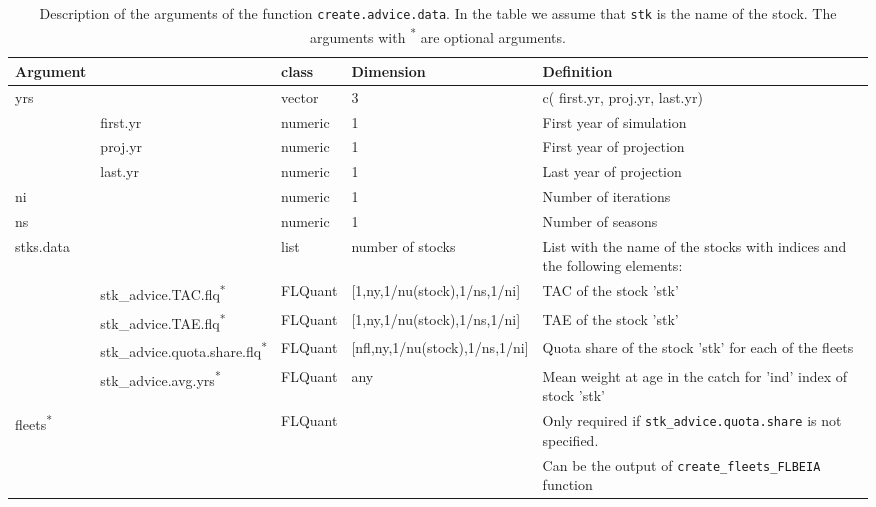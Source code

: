 \begin{landscape}
\begin{table}[!ht]
\end{table}

	

\begin{table}[!ht]

  \centering
  \begin{footnotesize}
    
    \caption{Description of the arguments of the function \texttt{create.advice.data}. 
      In the table we assume that \texttt{stk} is the name of the stock. 
      The arguments with \textsuperscript{*} are optional arguments.}
    
    \label{tb:A4.table6}
    
    \begin{threeparttable}
    
      \begin{tabular}{lllll} %
        \hline 
        Argument & & class & Dimension & Definition\\
        \hline
        yrs & & vector & 3 &	c( first.yr, proj.yr, last.yr)\\
          & first.yr & numeric & 1 & First year of simulation\\
          & proj.yr  & numeric & 1 & First year of projection\\
          & last.yr  & numeric & 1 & Last year of projection\\
        ni & & numeric &	1 &	Number of iterations\\
        ns & & numeric &	1 &	Number of seasons\\
        stks.data & &	list & number of stocks &	List with the name of the stocks with indices and the following elements:\\

          & stk\_advice.TAC.flq\textsuperscript{*} &	FLQuant &	[1,ny,1/nu(stock),1/ns,1/ni] &	TAC of the stock 'stk'\\
          & stk\_advice.TAE.flq\textsuperscript{*} &	FLQuant &	[1,ny,1/nu(stock),1/ns,1/ni] &	TAE of the stock 'stk'\\
          & stk\_advice.quota.share.flq\textsuperscript{*} &	FLQuant &	[nfl,ny,1/nu(stock),1/ns,1/ni] &	Quota share of the stock 'stk' for each of the fleets \\
          & stk\_advice.avg.yrs\textsuperscript{*} &	FLQuant &	any &	Mean weight at age in the catch for 'ind' index of stock 'stk'\\
        fleets\textsuperscript{*} & & FLQuant &	 &	Only required if \texttt{stk\_advice.quota.share} is not specified.\\
         & & & & Can be the output of \texttt{create\_fleets\_FLBEIA} function\\
        \hline
      \end{tabular}
      

\end{threeparttable}
\end{footnotesize}
\end{table}
\end{landscape}
